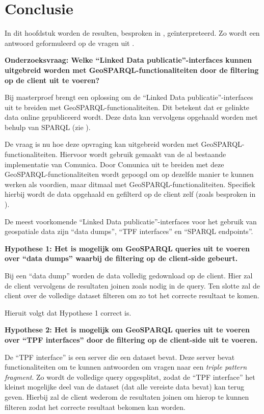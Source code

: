 \chapter{Conclusie}
\label{chap:conclusie}
In dit hoofdstuk worden de resulten, besproken in , geïnterpreteerd. Zo wordt een antwoord geformuleerd op de vragen uit .

\textbf{Onderzoeksvraag: Welke ``Linked Data publicatie''-interfaces kunnen uitgebreid worden met GeoSPARQL-functionaliteiten door de filtering op de client uit te voeren?}

Bij masterproef brengt een oplossing om de ``Linked Data publicatie''-interfaces uit te breiden met GeoSPARQL-functionaliteiten. Dit betekent dat er gelinkte data online gepubliceerd wordt. Deze data kan vervolgens opgehaald worden met behulp van SPARQL (zie ). 

De vraag is nu hoe deze opvraging kan uitgebreid worden met GeoSPARQL-functionaliteiten. Hiervoor wordt gebruik gemaakt van de al bestaande implementatie van Comunica. Door Comunica uit te breiden met deze GeoSPARQL-functionaliteiten wordt gepoogd om op dezelfde manier te kunnen werken als voordien, maar ditmaal met GeoSPARQL-functionaliteiten. Specifiek hierbij wordt de data opgehaald en gefilterd op de client zelf (zoals besproken in ).

De meest voorkomende ``Linked Data publicatie''-interfaces voor het gebruik van geospatiale data zijn ``data dumps'', ``TPF interfaces'' en ``SPARQL endpoints''.

\textbf{Hypothese 1: Het is mogelijk om GeoSPARQL queries uit te voeren over ``data dumps'' waarbij de filtering op de client-side gebeurt.}

Bij een ``data dump'' worden de data volledig gedownload op de client. Hier zal de client vervolgens de resultaten joinen zoals nodig in de query. Ten slotte zal de client over de volledige dataset filteren om zo tot het correcte resultaat te komen. 

Hieruit volgt dat Hypothese 1 correct is.

\textbf{Hypothese 2: Het is mogelijk om GeoSPARQL queries uit te voeren over ``TPF interfaces'' door de filtering op de client-side uit te voeren.}

De ``TPF interface'' is een server die een dataset bevat. Deze server bevat functionaliteiten om te kunnen antwoorden om vragen naar een \textit{triple pattern fragment}. Zo wordt de volledige query opgesplitst, zodat de ``TPF interface'' het kleinst mogelijke deel van de dataset (dat alle vereiste data bevat) kan terug geven. Hierbij zal de client wederom de resultaten joinen om hierop te kunnen filteren zodat het correcte resultaat bekomen kan worden.

